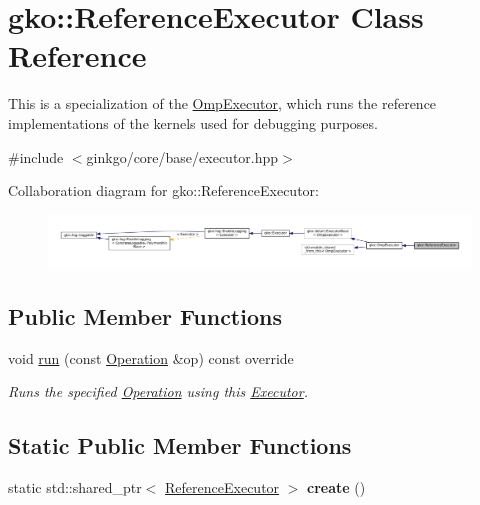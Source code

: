 \hypertarget{classgko_1_1ReferenceExecutor}{}\section{gko\+:\+:Reference\+Executor Class Reference}
\label{classgko_1_1ReferenceExecutor}


This is a specialization of the \hyperlink{classgko_1_1OmpExecutor}{Omp\+Executor}, which runs the reference implementations of the kernels used for debugging purposes.  




{\ttfamily \#include $<$ginkgo/core/base/executor.\+hpp$>$}



Collaboration diagram for gko\+:\+:Reference\+Executor\+:
\nopagebreak
\begin{figure}[H]
\begin{center}
\leavevmode
\includegraphics[width=350pt]{classgko_1_1ReferenceExecutor__coll__graph}
\end{center}
\end{figure}
\subsection*{Public Member Functions}
\begin{DoxyCompactItemize}
\item 
void \hyperlink{classgko_1_1ReferenceExecutor_a82b41b42dbd26e8ac5b0146de79e5d34}{run} (const \hyperlink{classgko_1_1Operation}{Operation} \&op) const override
\begin{DoxyCompactList}\small\item\em Runs the specified \hyperlink{classgko_1_1Operation}{Operation} using this \hyperlink{classgko_1_1Executor}{Executor}. \end{DoxyCompactList}\end{DoxyCompactItemize}
\subsection*{Static Public Member Functions}
\begin{DoxyCompactItemize}
\item 
\mbox{\label{classgko_1_1ReferenceExecutor_acf3e7c66635bd27e441677150199b72d}} 
static std\+::shared\+\_\+ptr$<$ \hyperlink{classgko_1_1ReferenceExecutor}{Reference\+Executor} $>$ {\bfseries create} ()
\end{DoxyCompactItemize}


